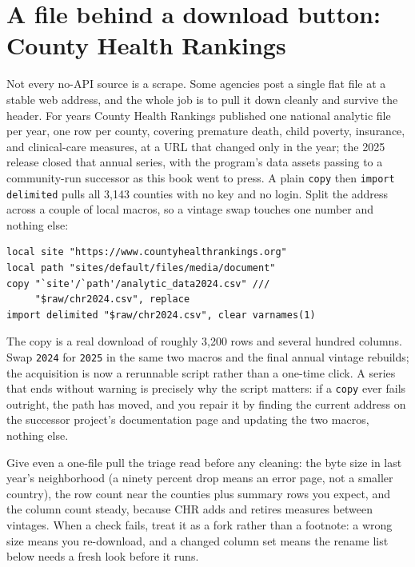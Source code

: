 \section{A file behind a download button: County Health Rankings}\label{sec:chr}
Not every no-API source is a scrape. Some agencies post a single flat file at a stable web address, and the whole job is to pull it down cleanly and survive the header. For years County Health Rankings published one national analytic file per year, one row per county, covering premature death, child poverty, insurance, and clinical-care measures, at a URL that changed only in the year; the 2025 release closed that annual series, with the program's data assets passing to a community-run successor as this book went to press. A plain \texttt{copy} then \texttt{import delimited} pulls all 3{,}143 counties with no key and no login. Split the address across a couple of local macros, so a vintage swap touches one number and nothing else:
\par
{\footnotesize
\begin{verbatim}
local site "https://www.countyhealthrankings.org"
local path "sites/default/files/media/document"
copy "`site'/`path'/analytic_data2024.csv" ///
     "$raw/chr2024.csv", replace
import delimited "$raw/chr2024.csv", clear varnames(1)
\end{verbatim}
}
The copy is a real download of roughly 3{,}200 rows and several hundred columns. Swap \texttt{2024} for \texttt{2025} in the same two macros and the final annual vintage rebuilds; the acquisition is now a rerunnable script rather than a one-time click. A series that ends without warning is precisely why the script matters: if a \texttt{copy} ever fails outright, the path has moved, and you repair it by finding the current address on the successor project's documentation page and updating the two macros, nothing else.

Give even a one-file pull the triage read before any cleaning: the byte size in last year's neighborhood (a ninety percent drop means an error page, not a smaller country), the row count near the counties plus summary rows you expect, and the column count steady, because CHR adds and retires measures between vintages. When a check fails, treat it as a fork rather than a footnote: a wrong size means you re-download, and a changed column set means the rename list below needs a fresh look before it runs.

